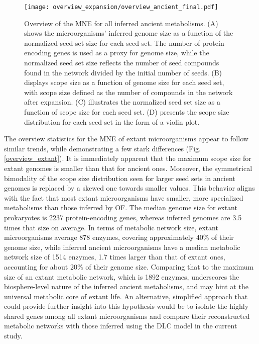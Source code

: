 \begin{figure}[H]
    \centering
    \texttt{[image: overview\_expansion/overview\_ancient\_final.pdf]}
    \caption{Overview of the MNE for all inferred ancient metabolisms. (A) shows the microorganisms' inferred genome size as a function of the normalized seed set size for each seed set. The number of protein-encoding genes is used as a proxy for genome size, while the normalized seed set size reflects the number of seed compounds found in the network divided by the initial number of seeds. (B) displays scope size as a function of genome size for each seed set, with scope size defined as the number of compounds in the network after expansion. (C) illustrates the normalized seed set size as a function of scope size for each seed set. (D) presents the scope size distribution for each seed set in the form of a violin plot.}
    \label{overview_ancient}
\end{figure} 

The overview statistics for the MNE of extant microorganisms appear to follow similar trends, while demonstrating a few stark differences (Fig. \ref{overview_extant}). It is immediately apparent that the maximum scope size for extant genomes is smaller than that for ancient ones. Moreover, the symmetrical bimodality of the scope size distribution seen for larger seed sets in ancient genomes is replaced by a skewed one towards smaller values. This behavior aligns with the fact that most extant microorganisms have smaller, more specialized metabolisms than those inferred by OF. The median genome size for extant prokaryotes is 2237 protein-encoding genes, whereas inferred genomes are 3.5 times that size on average. In terms of metabolic network size, extant microorganisms average 878 enzymes, covering approximately 40\% of their genome size, while inferred ancient microorganisms have a median metabolic network size of 1514 enzymes, 1.7 times larger than that of extant ones, accounting for about 20\% of their genome size. Comparing that to the maximum size of an extant metabolic network, which is 1892 enzymes, underscores the biosphere-level nature of the inferred ancient metabolisms, and may hint at the universal metabolic core of extant life. An alternative, simplified approach that could provide further insight into this hypothesis would be to isolate the highly shared genes among all extant microorganisms and compare their reconstructed metabolic networks with those inferred using the DLC model in the current study.

